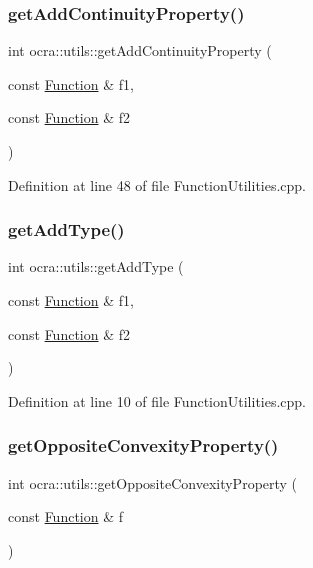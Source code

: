 \subsubsection{\texorpdfstring{get\+Add\+Continuity\+Property()}{getAddContinuityProperty()}}
{\footnotesize\ttfamily int ocra\+::utils\+::get\+Add\+Continuity\+Property (\begin{DoxyParamCaption}\item[{const \hyperlink{classocra_1_1Function}{Function} \&}]{f1,  }\item[{const \hyperlink{classocra_1_1Function}{Function} \&}]{f2 }\end{DoxyParamCaption})}



Definition at line 48 of file Function\+Utilities.\+cpp.

\hypertarget{namespaceocra_1_1utils_a71c5c6a8257c9a5bc5cc84e9a4fc2e68}{}\label{namespaceocra_1_1utils_a71c5c6a8257c9a5bc5cc84e9a4fc2e68} 
\subsubsection{\texorpdfstring{get\+Add\+Type()}{getAddType()}}
{\footnotesize\ttfamily int ocra\+::utils\+::get\+Add\+Type (\begin{DoxyParamCaption}\item[{const \hyperlink{classocra_1_1Function}{Function} \&}]{f1,  }\item[{const \hyperlink{classocra_1_1Function}{Function} \&}]{f2 }\end{DoxyParamCaption})}



Definition at line 10 of file Function\+Utilities.\+cpp.

\hypertarget{namespaceocra_1_1utils_a7a11f7cb798c473b72d7677b83ed859e}{}\label{namespaceocra_1_1utils_a7a11f7cb798c473b72d7677b83ed859e} 
\subsubsection{\texorpdfstring{get\+Opposite\+Convexity\+Property()}{getOppositeConvexityProperty()}}
{\footnotesize\ttfamily int ocra\+::utils\+::get\+Opposite\+Convexity\+Property (\begin{DoxyParamCaption}\item[{const \hyperlink{classocra_1_1Function}{Function} \&}]{f }\end{DoxyParamCaption})}



